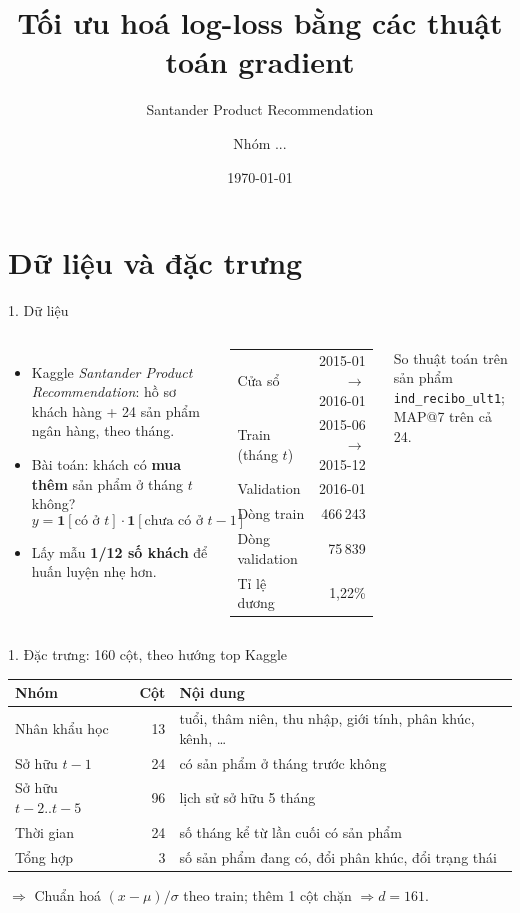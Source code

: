 \documentclass[aspectratio=169, 11pt]{beamer}
\title{Tối ưu hoá log-loss bằng các thuật toán gradient}
\subtitle{Santander Product Recommendation}
\author{Nhóm ...}
\date{\today}
\newcommand{\ketqua}[1]{\vfill{\small$\Rightarrow$ #1}}
\begin{document}
\frame{\titlepage}

\section{Dữ liệu và đặc trưng}

\begin{frame}{1. Dữ liệu}
  \begin{columns}[T]
      \begin{itemize}
        \item Kaggle \textit{Santander Product Recommendation}: hồ sơ khách hàng + 24 sản phẩm
              ngân hàng, theo tháng.
        \item Bài toán: khách có \textbf{mua thêm} sản phẩm ở tháng $t$ không?
              \[ y=\mathbf 1[\text{có ở }t]\cdot\mathbf 1[\text{chưa có ở }t-1] \]
        \item Lấy mẫu \textbf{1/12 số khách} để huấn luyện nhẹ hơn.
      \end{itemize}
      \footnotesize
      \begin{tabular}{lr}
        \toprule
        Cửa sổ           & 2015-01 $\to$ 2016-01 \\
        Train (tháng $t$) & 2015-06 $\to$ 2015-12 \\
        Validation       & 2016-01 \\
        Dòng train       & 466\,243 \\
        Dòng validation  & 75\,839 \\
        Tỉ lệ dương      & 1,22\% \\
        \bottomrule
      \end{tabular}

      \vspace{0.4em}
      {\scriptsize So thuật toán trên sản phẩm \texttt{ind\_recibo\_ult1}; MAP@7 trên cả 24.}
  \end{columns}
\end{frame}

\begin{frame}{1. Đặc trưng: 160 cột, theo hướng top Kaggle}
  \begin{center}
  \small
  \begin{tabular}{lrl}
    \toprule
    \textbf{Nhóm} & \textbf{Cột} & \textbf{Nội dung} \\
    \midrule
    Nhân khẩu học     & 13 & tuổi, thâm niên, thu nhập, giới tính, phân khúc, kênh, \ldots \\
    Sở hữu $t-1$      & 24 & có sản phẩm ở tháng trước không \\
    Sở hữu $t-2..t-5$ & 96 & lịch sử sở hữu 5 tháng \\
    Thời gian         & 24 & số tháng kể từ lần cuối có sản phẩm \\
    Tổng hợp          & 3  & số sản phẩm đang có, đổi phân khúc, đổi trạng thái \\
    \bottomrule
  \end{tabular}
  \end{center}
  \ketqua{Chuẩn hoá $(x-\mu)/\sigma$ theo train; thêm 1 cột chặn $\Rightarrow d=161$.}
\end{frame}
\end{document}
